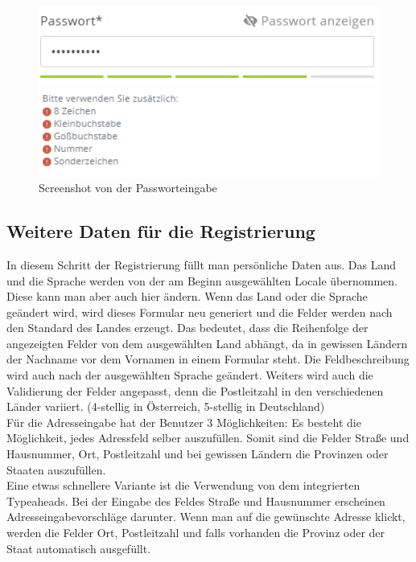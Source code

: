 \begin{figure}[H]
	\centerline{
		\includegraphics[width=1\textwidth]{./grafiken/passwordSecurity.PNG}
	}
	\vskip0pt
	\centerline{
		\includegraphics[width=1\textwidth]{./grafiken/passwordHints.PNG}
	}
	\caption{Screenshot von der Passworteingabe} \label{fig:pw}
\end{figure}

\subsection{Weitere Daten für die Registrierung}

In diesem Schritt der Registrierung füllt man persönliche Daten aus. Das Land und die Sprache werden von der am Beginn ausgewählten Locale übernommen. Diese kann man aber auch hier ändern. Wenn das Land oder die Sprache geändert wird, wird dieses Formular neu generiert und die Felder werden nach den Standard des Landes erzeugt. Das bedeutet, dass die Reihenfolge der angezeigten Felder von dem ausgewählten Land abhängt, da in gewissen Ländern der Nachname vor dem Vornamen in einem Formular steht. Die Feldbeschreibung wird auch nach der ausgewählten Sprache geändert. Weiters wird auch die Validierung der Felder angepasst, denn die Postleitzahl in den verschiedenen Länder variiert. (4-stellig in Österreich, 5-stellig in Deutschland)\\

Für die Adresseingabe hat der Benutzer 3 Möglichkeiten:
Es besteht die Möglichkeit, jedes Adressfeld selber auszufüllen. Somit sind die Felder Straße und Hausnummer, Ort, Postleitzahl und bei gewissen Ländern die Provinzen oder Staaten auszufüllen.\\

Eine etwas schnellere Variante ist die Verwendung von dem integrierten Typeaheads. Bei der Eingabe des Feldes Straße und Hausnummer erscheinen Adresseingabevorschläge darunter. Wenn man auf die gewünschte Adresse klickt, werden die Felder Ort, Postleitzahl und falls vorhanden die Provinz oder der Staat automatisch ausgefüllt.\\

